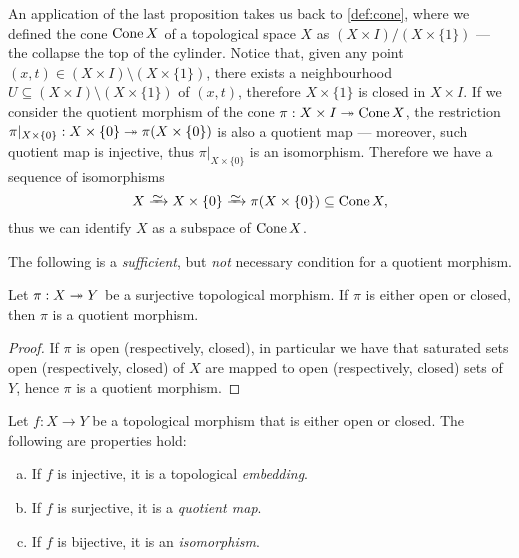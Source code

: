 \begin{example}[Cones]
    \label{exp:remove-section-cone-isomorphism}
    An application of the last proposition takes us back to \cref{def:cone}, where
    we defined the cone \(\operatorname{Cone} X\) of a topological space \(X\) as \((X \times I) /
    (X \times \{1\})\) --- the collapse the top of the cylinder. Notice that, given
    any point \((x, t) \in (X \times I) \setminus (X \times \{1\})\), there exists a
    neighbourhood \(U \subseteq (X \times I) \setminus (X \times \{1\})\) of \((x,
    t)\), therefore \(X \times \{1\}\) is closed in \(X \times I\). If we consider
    the quotient morphism of the cone \(\pi: X \times I \twoheadrightarrow \operatorname{Cone} X\), the
    restriction \(\pi|_{X \times \{0\}}: X \times \{0\} \twoheadrightarrow \pi(X \times \{0\})\)
    is also a quotient map --- moreover, such quotient map is injective, thus
    \(\pi|_{X \times \{0\}}\) is an isomorphism. Therefore we have a sequence of
    isomorphisms
    \[
        X \isoto X \times \{0\} \isoto \pi(X \times \{0\}) \subseteq \Cone X,
    \]
    thus we can identify \(X\) as a subspace of \(\operatorname{Cone} X\).
\end{example}

The following is a \emph{sufficient}, but \emph{not} necessary condition for a
quotient morphism.

\begin{proposition}
    Let \(\pi: X \twoheadrightarrow Y\) be a surjective topological morphism. If \(\pi\) is either
    open or closed, then \(\pi\) is a quotient morphism.
\end{proposition}

\begin{proof}
    If \(\pi\) is open (respectively, closed), in particular we have that saturated
    sets open (respectively, closed) of \(X\) are mapped to open (respectively,
    closed) sets of \(Y\), hence \(\pi\) is a quotient morphism.
\end{proof}

\begin{proposition}
    \label{prop:map-open-or-closed-properties}
    Let \(f: X \to Y\) be a topological morphism that is either open or closed. The
    following are properties hold:
    \begin{enumerate}[(a)]\setlength\itemsep{0em}
        \item If \(f\) is injective, it is a topological \emph{embedding}.

        \item If \(f\) is surjective, it is a \emph{quotient map}.

        \item If \(f\) is bijective, it is an \emph{isomorphism}.
    \end{enumerate}
\end{proposition}

